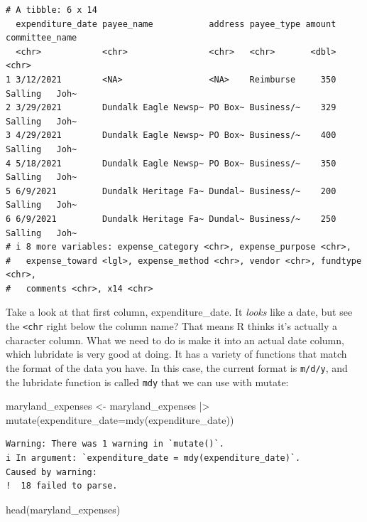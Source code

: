 \documentclass[
  letterpaper,
  DIV=11,
  numbers=noendperiod]{scrreprt}
\newenvironment{Shaded}{\begin{snugshade}}{\end{snugshade}}
\newcommand{\AttributeTok}[1]{\textcolor[rgb]{0.40,0.45,0.13}{#1}}
\newcommand{\FunctionTok}[1]{\textcolor[rgb]{0.28,0.35,0.67}{#1}}
\newcommand{\NormalTok}[1]{\textcolor[rgb]{0.00,0.23,0.31}{#1}}
\newcommand{\OtherTok}[1]{\textcolor[rgb]{0.00,0.23,0.31}{#1}}
\newcommand{\SpecialCharTok}[1]{\textcolor[rgb]{0.37,0.37,0.37}{#1}}
\begin{document}
\begin{verbatim}
# A tibble: 6 x 14
  expenditure_date payee_name           address payee_type amount committee_name
  <chr>            <chr>                <chr>   <chr>       <dbl> <chr>         
1 3/12/2021        <NA>                 <NA>    Reimburse     350 Salling   Joh~
2 3/29/2021        Dundalk Eagle Newsp~ PO Box~ Business/~    329 Salling   Joh~
3 4/29/2021        Dundalk Eagle Newsp~ PO Box~ Business/~    400 Salling   Joh~
4 5/18/2021        Dundalk Eagle Newsp~ PO Box~ Business/~    350 Salling   Joh~
5 6/9/2021         Dundalk Heritage Fa~ Dundal~ Business/~    200 Salling   Joh~
6 6/9/2021         Dundalk Heritage Fa~ Dundal~ Business/~    250 Salling   Joh~
# i 8 more variables: expense_category <chr>, expense_purpose <chr>,
#   expense_toward <lgl>, expense_method <chr>, vendor <chr>, fundtype <chr>,
#   comments <chr>, x14 <chr>
\end{verbatim}

Take a look at that first column, expenditure\_date. It \emph{looks}
like a date, but see the \texttt{\textless{}chr} right below the column
name? That means R thinks it's actually a character column. What we need
to do is make it into an actual date column, which lubridate is very
good at doing. It has a variety of functions that match the format of
the data you have. In this case, the current format is \texttt{m/d/y},
and the lubridate function is called \texttt{mdy} that we can use with
mutate:

\begin{Shaded}
\begin{Highlighting}[]
\NormalTok{maryland\_expenses }\OtherTok{\textless{}{-}}\NormalTok{ maryland\_expenses }\SpecialCharTok{|\textgreater{}} \FunctionTok{mutate}\NormalTok{(}\AttributeTok{expenditure\_date=}\FunctionTok{mdy}\NormalTok{(expenditure\_date))}
\end{Highlighting}
\end{Shaded}

\begin{verbatim}
Warning: There was 1 warning in `mutate()`.
i In argument: `expenditure_date = mdy(expenditure_date)`.
Caused by warning:
!  18 failed to parse.
\end{verbatim}

\begin{Shaded}
\begin{Highlighting}[]
\FunctionTok{head}\NormalTok{(maryland\_expenses)}
\end{Highlighting}
\end{Shaded}
\end{document}
